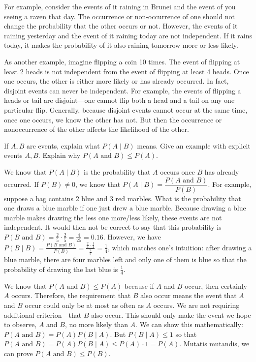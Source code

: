\documentclass[11pt,letterpaper]{article}
\begin{document}
For example, consider the events of it raining in Brunei and the event of you seeing a raven that day. The occurrence or non-occurrence of one should not change the probability that the other occurs or not. However, the events of it raining yesterday and the event of it raining today are not independent. If it rains today, it makes the probability of it also raining tomorrow more or less likely. \pspace

As another example, imagine flipping a coin 10 times. The event of flipping at least 2 heads is not independent from the event of flipping at least 4 heads. Once one occurs, the other is either more likely or has already occurred. In fact, disjoint events can never be independent. For example, the events of flipping a heads or tail are disjoint---one cannot flip both a head and a tail on any one particular flip. Generally, because disjoint events cannot occur at the same time, once one occurs, we know the other has not. But then the occurrence or nonoccurrence of the other affects the likelihood of the other. 



\newpage



 If $A, B$ are events, explain what $P(A \;|\; B)$ means. Give an example with explicit events $A, B$. Explain why $P(A \text{ and } B) \leq P(A)$. \pspace

\sol We know that $P(A \;|\; B)$ is the probability that $A$ occurs once $B$ has already occurred. If $P(B) \neq 0$, we know that $P(A \;|\; B)= \dfrac{P(A \text{ and } B)}{P(B)}$. For example, suppose a bag contains 2 blue and 3 red marbles. What is the probability that one draws a blue marble if one just drew a blue marble. Because drawing a blue marble makes drawing the less one more/less likely, these events are not independent. It would then not be correct to say that this probability is $P(B \text{ and } B)= \frac{2}{5} \cdot \frac{2}{5}= \frac{4}{25}= 0.16$. However, we have $P(B \;|\; B)= \frac{P(B \text{ and } B)}{P(B)}= \frac{\frac{2}{5} \cdot \frac{1}{4}}{\frac{2}{5}}= \frac{1}{4}$, which matches one's intuition: after drawing a blue marble, there are four marbles left and only one of them is blue so that the probability of drawing the last blue is $\frac{1}{4}$. \pspace

We know that $P(A \text{ and } B) \leq P(A)$ because if $A$ and $B$ occur, then certainly $A$ occurs. Therefore, the requirement that $B$ also occur means the event that $A$ and $B$ occur could only be at most as often as $A$ occurs. We are not requiring additional criterion---that $B$ also occur. This should only make the event we hope to observe, $A$ and $B$, no more likely than $A$. We can show this mathematically: $P(A \text{ and } B)= P(A) P(B \;|\; A)$. But $P(B \;|\; A) \leq 1$ so that $P(A \text{ and } B)= P(A) P(B \;|\; A) \leq P(A) \cdot 1= P(A)$. Mutatis mutandis, we can prove $P(A \text{ and } B) \leq P(B)$. 
\end{document}
